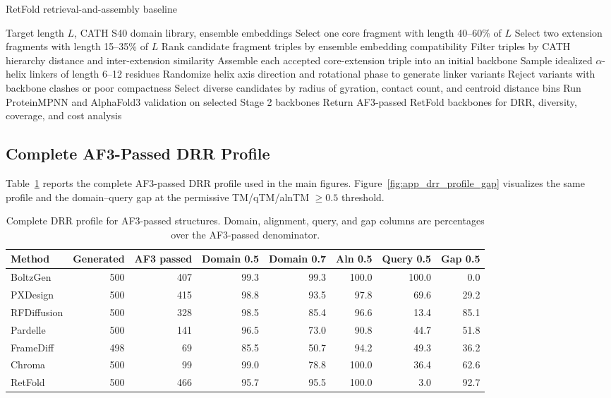 \documentclass[letterpaper]{article} %
\begin{document}
\begin{algorithm}[t]
\caption{RetFold retrieval-and-assembly baseline}
\label{alg:retfold}
\begin{algorithmic}[1]
\REQUIRE Target length $L$, CATH S40 domain library, ensemble embeddings
\STATE Select one core fragment with length 40--60\% of $L$
\STATE Select two extension fragments with length 15--35\% of $L$
\STATE Rank candidate fragment triples by ensemble embedding compatibility
\STATE Filter triples by CATH hierarchy distance and inter-extension similarity
\STATE Assemble each accepted core-extension triple into an initial backbone
    \STATE Sample idealized $\alpha$-helix linkers of length 6--12 residues
    \STATE Randomize helix axis direction and rotational phase to generate linker variants
    \STATE Reject variants with backbone clashes or poor compactness
    \STATE Select diverse candidates by radius of gyration, contact count, and centroid distance bins
\ENDFOR
\STATE Run ProteinMPNN and AlphaFold3 validation on selected Stage 2 backbones
\STATE Return AF3-passed RetFold backbones for DRR, diversity, coverage, and cost analysis
\end{algorithmic}
\end{algorithm}

\subsection{Complete AF3-Passed DRR Profile}

Table~\ref{tab:app_drr_passed} reports the complete AF3-passed DRR profile used in the main figures. Figure~\ref{fig:app_drr_profile_gap} visualizes the same profile and the domain--query gap at the permissive TM/qTM/alnTM $\geq 0.5$ threshold.

\begin{table}[t]
\centering
\small
\begin{tabular}{lrrrrrrr}
\toprule
Method & Generated & AF3 passed & Domain 0.5 & Domain 0.7 & Aln 0.5 & Query 0.5 & Gap 0.5 \\
\midrule
BoltzGen & 500 & 407 & 99.3 & 99.3 & 100.0 & 100.0 & 0.0 \\
PXDesign & 500 & 415 & 98.8 & 93.5 & 97.8 & 69.6 & 29.2 \\
RFDiffusion & 500 & 328 & 98.5 & 85.4 & 96.6 & 13.4 & 85.1 \\
Pardelle & 500 & 141 & 96.5 & 73.0 & 90.8 & 44.7 & 51.8 \\
FrameDiff & 498 & 69 & 85.5 & 50.7 & 94.2 & 49.3 & 36.2 \\
Chroma & 500 & 99 & 99.0 & 78.8 & 100.0 & 36.4 & 62.6 \\
RetFold & 500 & 466 & 95.7 & 95.5 & 100.0 & 3.0 & 92.7 \\
\bottomrule
\end{tabular}
\caption{Complete DRR profile for AF3-passed structures. Domain, alignment, query, and gap columns are percentages over the AF3-passed denominator.}
\label{tab:app_drr_passed}
\end{table}
\end{document}
